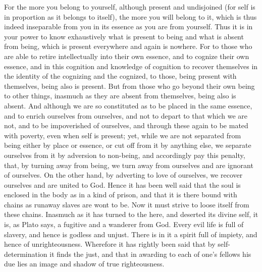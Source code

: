 \documentclass[12pt]{article}
\begin{document}
For the more you belong to yourself, although present and undisjoined (for self is in proportion as it belongs to itself), the more you will belong to it, which is thus indeed inseparable from you in its essence as you are from yourself. Thus it is in your power to know exhaustively what is present to being and what is absent from being, which is present everywhere and again is nowhere. For to those who are able to retire intellectually into their own essence, and to cognize their own essence, and in this cognition and knowledge of cognition to recover themselves in the identity of the cognizing and the cognized, to those, being present with themselves, being also is present. But from those who go beyond their own being to other things, inasmuch as they are absent from themselves, being also is absent. And although we are so constituted as to be placed in the same essence, and to enrich ourselves from ourselves, and not to depart to that which we are not, and to be impoverished of ourselves, and through these again to be mated with poverty, even when self is present; yet, while we are not separated from being either by place or essence, or cut off from it by anything else, we separate ourselves from it by adversion to non-being, and accordingly pay this penalty, that, by turning away from being, we turn away from ourselves and are ignorant of ourselves. On the other hand, by adverting to love of ourselves, we recover ourselves and are united to God. Hence it has been well said that the soul is enclosed in the body as in a kind of prison, and that it is there bound with chains as runaway slaves are wont to be. Now it must strive to loose itself from these chains. Inasmuch as it has turned to the here, and deserted its divine self, it is, as Plato says, a fugitive and a wanderer from God. Every evil life is full of slavery, and hence is godless and unjust. There is in it a spirit full of impiety, and hence of unrighteousness. Wherefore it has rightly been said that by self-determination it finds the just, and that in awarding to each of one's fellows his due lies an image and shadow of true righteousness.
\end{document}

